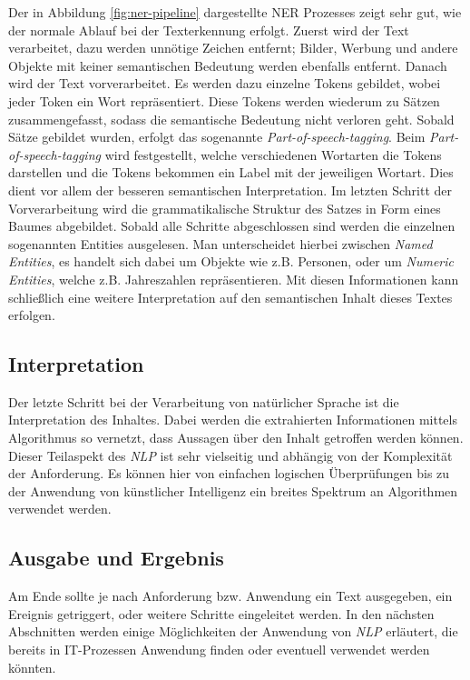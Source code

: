 Der in Abbildung \ref{fig:ner-pipeline} dargestellte NER Prozesses zeigt sehr gut, wie der normale Ablauf bei der Texterkennung erfolgt. Zuerst wird der Text verarbeitet, dazu werden unnötige Zeichen entfernt; Bilder, Werbung und andere Objekte mit keiner semantischen Bedeutung werden ebenfalls entfernt. Danach wird der Text vorverarbeitet. Es werden dazu einzelne Tokens gebildet, wobei jeder Token ein Wort repräsentiert. Diese Tokens werden wiederum zu Sätzen zusammengefasst, sodass die semantische Bedeutung nicht verloren geht. Sobald Sätze gebildet wurden, erfolgt das sogenannte \textit{Part-of-speech-tagging}. Beim \textit{Part-of-speech-tagging} wird festgestellt, welche verschiedenen Wortarten die Tokens darstellen und die Tokens bekommen ein Label mit der jeweiligen Wortart. Dies dient vor allem der besseren semantischen Interpretation. Im letzten Schritt der Vorverarbeitung wird die grammatikalische Struktur des Satzes in Form eines Baumes abgebildet. Sobald alle Schritte abgeschlossen sind werden die einzelnen sogenannten Entities ausgelesen. Man unterscheidet hierbei zwischen \textit{Named Entities}, es handelt sich dabei um Objekte wie z.B. Personen, oder um \textit{Numeric Entities}, welche z.B. Jahreszahlen repräsentieren. Mit diesen Informationen kann schließlich eine weitere Interpretation auf den semantischen Inhalt dieses Textes erfolgen.

\subsection{Interpretation}
Der letzte Schritt bei der Verarbeitung von natürlicher Sprache ist die Interpretation des Inhaltes. Dabei werden die extrahierten Informationen mittels Algorithmus so vernetzt, dass Aussagen über den Inhalt getroffen werden können. Dieser Teilaspekt des \textit{NLP} ist sehr vielseitig und abhängig von der Komplexität der Anforderung. Es können hier von einfachen logischen Überprüfungen bis zu der Anwendung von künstlicher Intelligenz ein breites Spektrum an Algorithmen verwendet werden. 

\subsection{Ausgabe und Ergebnis}
Am Ende sollte je nach Anforderung bzw. Anwendung ein Text ausgegeben, ein Ereignis getriggert, oder weitere Schritte eingeleitet werden. In den nächsten Abschnitten werden einige Möglichkeiten der Anwendung von \textit{NLP} erläutert, die bereits in IT-Prozessen Anwendung finden oder eventuell verwendet werden könnten. 

